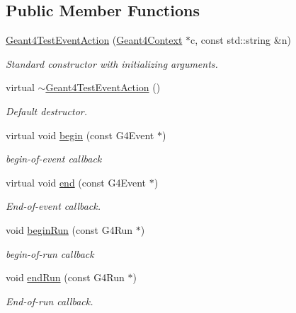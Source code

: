 \subsection*{Public Member Functions}
\begin{DoxyCompactItemize}
\item 
\hyperlink{class_d_d4hep_1_1_simulation_1_1_test_1_1_geant4_test_event_action_a00fe97a5df38edd9785f25af737cd7d0}{Geant4TestEventAction} (\hyperlink{class_d_d4hep_1_1_simulation_1_1_geant4_context}{Geant4Context} $\ast$c, const std::string \&n)
\begin{DoxyCompactList}\small\item\em Standard constructor with initializing arguments. \item\end{DoxyCompactList}\item 
virtual \hyperlink{class_d_d4hep_1_1_simulation_1_1_test_1_1_geant4_test_event_action_abef0a0d05514f5882003ae2f45e59ed7}{$\sim$Geant4TestEventAction} ()
\begin{DoxyCompactList}\small\item\em Default destructor. \item\end{DoxyCompactList}\item 
virtual void \hyperlink{class_d_d4hep_1_1_simulation_1_1_test_1_1_geant4_test_event_action_a9bce3a0885c7d2d5c6b03756ea3c4e23}{begin} (const G4Event $\ast$)
\begin{DoxyCompactList}\small\item\em begin-\/of-\/event callback \item\end{DoxyCompactList}\item 
virtual void \hyperlink{class_d_d4hep_1_1_simulation_1_1_test_1_1_geant4_test_event_action_a1b436d5b8c7b3f9fa93bc2b04946cad3}{end} (const G4Event $\ast$)
\begin{DoxyCompactList}\small\item\em End-\/of-\/event callback. \item\end{DoxyCompactList}\item 
void \hyperlink{class_d_d4hep_1_1_simulation_1_1_test_1_1_geant4_test_event_action_ab8bf5d68032c1a27015c9396eb713c5f}{beginRun} (const G4Run $\ast$)
\begin{DoxyCompactList}\small\item\em begin-\/of-\/run callback \item\end{DoxyCompactList}\item 
void \hyperlink{class_d_d4hep_1_1_simulation_1_1_test_1_1_geant4_test_event_action_ad5a3426363b043ddd19476871cd4a93c}{endRun} (const G4Run $\ast$)
\begin{DoxyCompactList}\small\item\em End-\/of-\/run callback. \item\end{DoxyCompactList}\end{DoxyCompactItemize}


